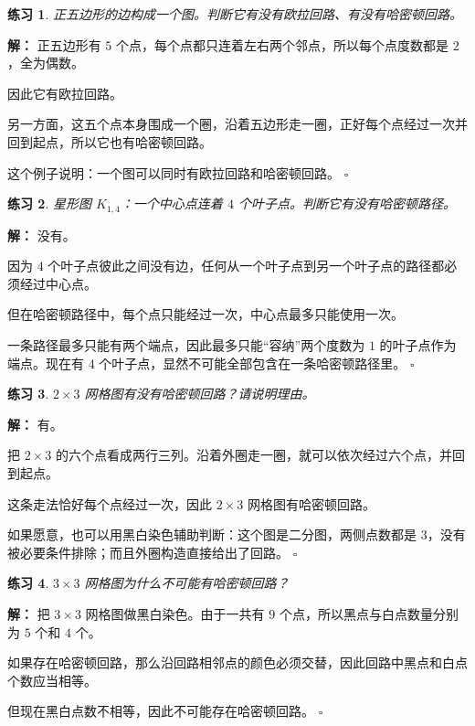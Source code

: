 \documentclass[11pt,a4paper,fontset=fandol]{ctexart}
\theoremstyle{formaltheorem}
\theoremstyle{formalexample}
\newtheorem{exercise}{练习}[section]
\newenvironment{solution}{\par\noindent\textbf{解：}}{\hfill$\square$\par}
\begin{document}
\begin{exercise}
正五边形的边构成一个图。判断它有没有欧拉回路、有没有哈密顿回路。
\end{exercise}

\begin{solution}
正五边形有 $5$ 个点，每个点都只连着左右两个邻点，所以每个点度数都是 $2$，全为偶数。

因此它有欧拉回路。

另一方面，这五个点本身围成一个圈，沿着五边形走一圈，正好每个点经过一次并回到起点，所以它也有哈密顿回路。

这个例子说明：一个图可以同时有欧拉回路和哈密顿回路。
\end{solution}

\begin{exercise}
星形图 $K_{1,4}$：一个中心点连着 $4$ 个叶子点。判断它有没有哈密顿路径。
\end{exercise}

\begin{solution}
没有。

因为 $4$ 个叶子点彼此之间没有边，任何从一个叶子点到另一个叶子点的路径都必须经过中心点。

但在哈密顿路径中，每个点只能经过一次，中心点最多只能使用一次。

一条路径最多只能有两个端点，因此最多只能“容纳”两个度数为 $1$ 的叶子点作为端点。现在有 $4$ 个叶子点，显然不可能全部包含在一条哈密顿路径里。
\end{solution}

\begin{exercise}
$2\times 3$ 网格图有没有哈密顿回路？请说明理由。
\end{exercise}

\begin{solution}
有。

把 $2\times 3$ 的六个点看成两行三列。沿着外圈走一圈，就可以依次经过六个点，并回到起点。

这条走法恰好每个点经过一次，因此 $2\times 3$ 网格图有哈密顿回路。

如果愿意，也可以用黑白染色辅助判断：这个图是二分图，两侧点数都是 $3$，没有被必要条件排除；而且外圈构造直接给出了回路。
\end{solution}

\begin{exercise}
$3\times 3$ 网格图为什么不可能有哈密顿回路？
\end{exercise}

\begin{solution}
把 $3\times 3$ 网格图做黑白染色。由于一共有 $9$ 个点，所以黑点与白点数量分别为 $5$ 个和 $4$ 个。

如果存在哈密顿回路，那么沿回路相邻点的颜色必须交替，因此回路中黑点和白点个数应当相等。

但现在黑白点数不相等，因此不可能存在哈密顿回路。
\end{solution}
\end{document}
